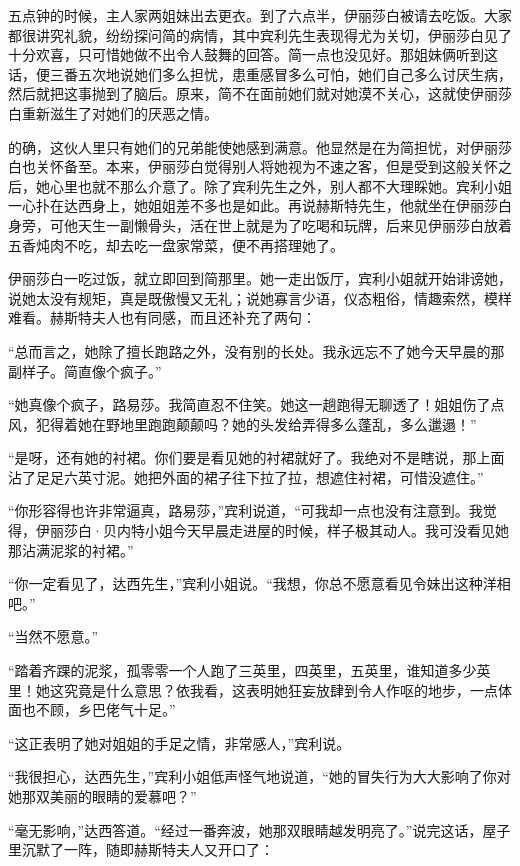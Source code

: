 \par 五点钟的时候，主人家两姐妹出去更衣。到了六点半，伊丽莎白被请去吃饭。大家都很讲究礼貌，纷纷探问简的病情，其中宾利先生表现得尤为关切，伊丽莎白见了十分欢喜，只可惜她做不出令人鼓舞的回答。简一点也没见好。那姐妹俩听到这话，便三番五次地说她们多么担忧，患重感冒多么可怕，她们自己多么讨厌生病，然后就把这事抛到了脑后。原来，简不在面前她们就对她漠不关心，这就使伊丽莎白重新滋生了对她们的厌恶之情。
\par 的确，这伙人里只有她们的兄弟能使她感到满意。他显然是在为简担忧，对伊丽莎白也关怀备至。本来，伊丽莎白觉得别人将她视为不速之客，但是受到这般关怀之后，她心里也就不那么介意了。除了宾利先生之外，别人都不大理睬她。宾利小姐一心扑在达西身上，她姐姐差不多也是如此。再说赫斯特先生，他就坐在伊丽莎白身旁，可他天生一副懒骨头，活在世上就是为了吃喝和玩牌，后来见伊丽莎白放着五香炖肉不吃，却去吃一盘家常菜，便不再搭理她了。
\par 伊丽莎白一吃过饭，就立即回到简那里。她一走出饭厅，宾利小姐就开始诽谤她，说她太没有规矩，真是既傲慢又无礼；说她寡言少语，仪态粗俗，情趣索然，模样难看。赫斯特夫人也有同感，而且还补充了两句：
\par “总而言之，她除了擅长跑路之外，没有别的长处。我永远忘不了她今天早晨的那副样子。简直像个疯子。”
\par “她真像个疯子，路易莎。我简直忍不住笑。她这一趟跑得无聊透了！姐姐伤了点风，犯得着她在野地里跑跑颠颠吗？她的头发给弄得多么蓬乱，多么邋遢！”
\par “是呀，还有她的衬裙。你们要是看见她的衬裙就好了。我绝对不是瞎说，那上面沾了足足六英寸泥。她把外面的裙子往下拉了拉，想遮住衬裙，可惜没遮住。”
\par “你形容得也许非常逼真，路易莎，”宾利说道，“可我却一点也没有注意到。我觉得，伊丽莎白·贝内特小姐今天早晨走进屋的时候，样子极其动人。我可没看见她那沾满泥浆的衬裙。”
\par “你一定看见了，达西先生，”宾利小姐说。“我想，你总不愿意看见令妹出这种洋相吧。”
\par “当然不愿意。”
\par “踏着齐踝的泥浆，孤零零一个人跑了三英里，四英里，五英里，谁知道多少英里！她这究竟是什么意思？依我看，这表明她狂妄放肆到令人作呕的地步，一点体面也不顾，乡巴佬气十足。”
\par “这正表明了她对姐姐的手足之情，非常感人，”宾利说。
\par “我很担心，达西先生，”宾利小姐低声怪气地说道，“她的冒失行为大大影响了你对她那双美丽的眼睛的爱慕吧？”
\par “毫无影响，”达西答道。“经过一番奔波，她那双眼睛越发明亮了。”说完这话，屋子里沉默了一阵，随即赫斯特夫人又开口了：
